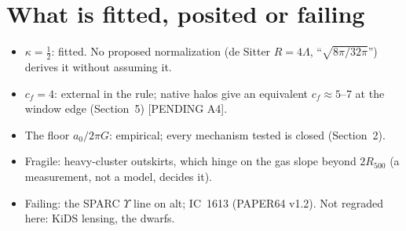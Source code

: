 \documentclass[10pt]{article}
\begin{document}
\section{What is fitted, posited or failing}
\begin{itemize}
\item $\kappa=\tfrac12$: fitted. No proposed normalization (de Sitter $R=4\Lambda$, ``$\sqrt{8\pi/32\pi}$'') derives it without assuming it.
\item $c_f=4$: external in the rule; native halos give an equivalent $c_f\approx5$--7 at the window edge (Section~5) [PENDING A4].
\item The floor $a_0/2\pi G$: empirical; every mechanism tested is closed (Section~2).
\item Fragile: heavy-cluster outskirts, which hinge on the gas slope beyond $2R_{500}$ (a measurement, not a model, decides it).
\item Failing: the SPARC $\Upsilon$ line on alt; IC~1613 (PAPER64 v1.2). Not regraded here: KiDS lensing, the dwarfs.
\end{itemize}
\end{document}
